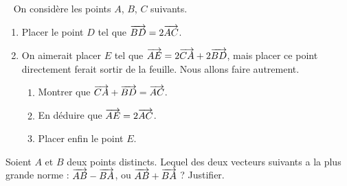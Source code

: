 \documentclass[12pt]{article}
\begin{document}
\begin{exercice}~
  On considère les points $A$, $B$, $C$ suivants.
  \begin{center}
  \end{center}
  \begin{enumerate}
    \item Placer le point $D$ tel que $\overrightarrow{BD}=2\overrightarrow{AC}$.
    \item On aimerait placer $E$ tel que $\overrightarrow{AE}=2\overrightarrow{CA}+2\overrightarrow{BD}$, mais placer ce point directement ferait sortir de la feuille. Nous allons faire autrement.
      \begin{enumerate}
        \item Montrer que $\overrightarrow{CA}+\overrightarrow{BD}=\overrightarrow{AC}$.
        \item En déduire que $\overrightarrow{AE}=2\overrightarrow{AC}$.
        \item Placer enfin le point $E$.
      \end{enumerate}
  \end{enumerate}

\end{exercice}

\begin{exercice}
  Soient $A$ et $B$ deux points distincts. Lequel des deux vecteurs suivants a
  la plus grande norme : $\overrightarrow{AB}-\overrightarrow{BA}$, ou
  $\overrightarrow{AB}+\overrightarrow{BA}$ ? Justifier.
\end{exercice}
\end{document}
